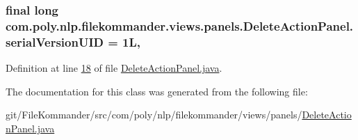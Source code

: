 \hypertarget{classcom_1_1poly_1_1nlp_1_1filekommander_1_1views_1_1panels_1_1_delete_action_panel_a1f7b0dccb1eaac83b09874cb95feb7cc}{
\subsubsection[{serial\-Version\-U\-I\-D}]{\setlength{\rightskip}{0pt plus 5cm}final long com.\-poly.\-nlp.\-filekommander.\-views.\-panels.\-Delete\-Action\-Panel.\-serial\-Version\-U\-I\-D = 1\-L\hspace{0.3cm}{\ttfamily [static]}, {\ttfamily [private]}}}\label{classcom_1_1poly_1_1nlp_1_1filekommander_1_1views_1_1panels_1_1_delete_action_panel_a1f7b0dccb1eaac83b09874cb95feb7cc}


Definition at line \hyperlink{L18}{18} of file \hyperlink{}{Delete\-Action\-Panel.\-java}.



The documentation for this class was generated from the following file\-:\begin{DoxyCompactItemize}
\item 
git/\-File\-Kommander/src/com/poly/nlp/filekommander/views/panels/\hyperlink{_delete_action_panel_8java}{Delete\-Action\-Panel.\-java}\end{DoxyCompactItemize}
